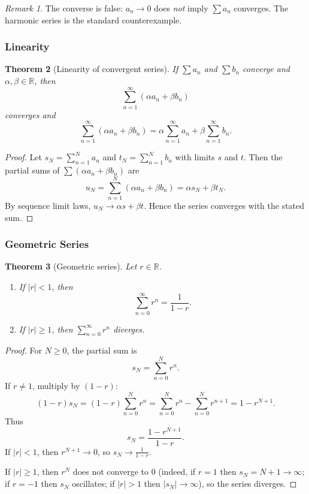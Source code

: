 \documentclass[12pt]{article}
\numberwithin{equation}{section}
\def\abs#1{|#1|}
\newcommand{\RR}{\mathbb{R}}
\DeclarePairedDelimiter{\abs}{\lvert}{\rvert}
\theoremstyle{plain}
\newtheorem{theorem}{Theorem}[section]
\theoremstyle{definition}
\theoremstyle{remark}
\newtheorem{remark}[theorem]{Remark}
\begin{document}
\begin{remark}
The converse is false: $a_n\to 0$ does \emph{not} imply $\sum a_n$ converges. The harmonic series is the standard counterexample.
\end{remark}

\subsubsection{Linearity}

\begin{theorem}[Linearity of convergent series]\label{thm:series-linearity}
If $\sum a_n$ and $\sum b_n$ converge and $\alpha,\beta\in\RR$, then
\[
\sum_{n=1}^{\infty} (\alpha a_n+\beta b_n)
\]
converges and
\[
\sum_{n=1}^{\infty} (\alpha a_n+\beta b_n)
=
\alpha\sum_{n=1}^{\infty} a_n
+
\beta\sum_{n=1}^{\infty} b_n.
\]
\end{theorem}

\begin{proof}
Let $s_N=\sum_{n=1}^{N}a_n$ and $t_N=\sum_{n=1}^{N}b_n$ with limits $s$ and $t$.
Then the partial sums of $\sum(\alpha a_n+\beta b_n)$ are
\[
u_N=\sum_{n=1}^{N}(\alpha a_n+\beta b_n)=\alpha s_N+\beta t_N.
\]
By sequence limit laws, $u_N\to \alpha s+\beta t$. Hence the series converges with the stated sum.
\end{proof}

\subsubsection{Geometric Series}

\begin{theorem}[Geometric series]\label{thm:geometric}
Let $r\in\RR$.
\begin{enumerate}[label=(\alph*)]
\item If $\abs{r}<1$, then
\[
\sum_{n=0}^{\infty} r^n = \frac{1}{1-r}.
\]
\item If $\abs{r}\ge 1$, then $\sum_{n=0}^{\infty} r^n$ diverges.
\end{enumerate}
\end{theorem}

\begin{proof}
For $N\ge 0$, the partial sum is
\[
s_N=\sum_{n=0}^{N} r^n.
\]
If $r\neq 1$, multiply by $(1-r)$:
\[
(1-r)s_N = (1-r)\sum_{n=0}^{N}r^n = \sum_{n=0}^{N}r^n - \sum_{n=0}^{N}r^{n+1} = 1-r^{N+1}.
\]
Thus
\[
s_N=\frac{1-r^{N+1}}{1-r}.
\]
If $\abs{r}<1$, then $r^{N+1}\to 0$, so $s_N\to \frac{1}{1-r}$.

If $\abs{r}\ge 1$, then $r^{N}$ does not converge to $0$ (indeed, if $r=1$ then $s_N=N+1\to\infty$; if $r=-1$ then $s_N$ oscillates; if $\abs{r}>1$ then $\abs{s_N}\to\infty$), so the series diverges.
\end{proof}
\end{document}
